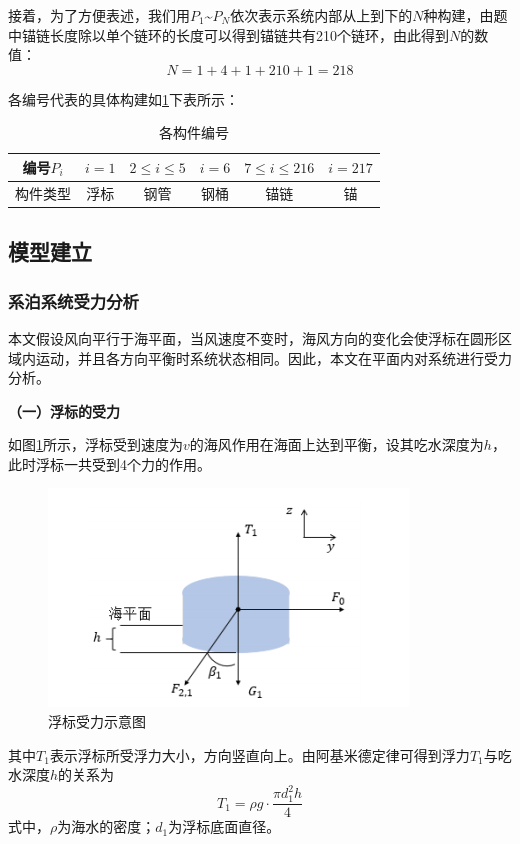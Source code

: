 \documentclass{article}
\numberwithin{equation}{subsection}
\begin{document}
接着，为了方便表述，我们用$P_{1}$\textasciitilde $P_{N}$依次表示系统内部从上到下的$N$种构建，由题中锚链长度除以单个链环的长度可以得到锚链共有210个链环，由此得到$N$的数值：
$$N=1+4+1+210+1=218$$

各编号代表的具体构建如\ref{构件编号}下表所示：
\begin{table}[!htbp]
\centering
    \begin{tabular}{|c|c|c|c|c|c|}
\hline
编号$P_{i}$ & $i=1$&$2\le i\le5$&$i=6$&$7\le i\le216$&$i=217$\\
\hline
构件类型&浮标&钢管&钢桶&锚链&锚\\
\hline
    \end{tabular}
    \caption{各构件编号}
    \label{构件编号}
\end{table}




\subsection{模型建立}
\subsubsection{系泊系统受力分析}
本文假设风向平行于海平面，当风速度不变时，海风方向的变化会使浮标在圆形区域内运动，并且各方向平衡时系统状态相同。因此，本文在平面内对系统进行受力分析。

\begin{flushleft}
\textbf{（一）浮标的受力}
\end{flushleft}
如图\ref{浮标受力}所示，浮标受到速度为$v$的海风作用在海面上达到平衡，设其吃水深度为$h$，此时浮标一共受到4个力的作用。

\begin{figure}[H]
  \centering
  \includegraphics[scale=0.6]{2.png}
  \caption{浮标受力示意图}
  \label{浮标受力}
\end{figure}
其中$T_{1}$表示浮标所受浮力大小，方向竖直向上。由阿基米德定律可得到浮力$T_{1}$与吃水深度$h$的关系为
\begin{equation}
    T_{1}=\rho g\cdot\frac{\pi d_{1}^{2}h}{4}
\end{equation}
式中，$\rho$为海水的密度；$d_{1}$为浮标底面直径。
\end{document}
